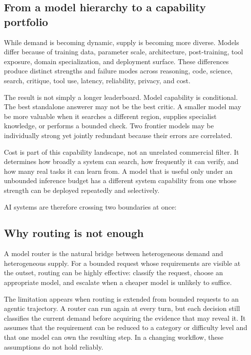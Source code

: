 \subsection{From a model hierarchy to a capability portfolio}

While demand is becoming dynamic, supply is becoming more diverse. Models
differ because of training data, parameter scale, architecture, post-training,
tool exposure, domain specialization, and deployment surface. These differences
produce distinct strengths and failure modes across reasoning, code, science,
search, critique, tool use, latency, reliability, privacy, and cost.

The result is not simply a longer leaderboard. Model capability is conditional.
The best standalone answerer may not be the best critic. A smaller model may be
more valuable when it searches a different region, supplies specialist
knowledge, or performs a bounded check. Two frontier models may be individually
strong yet jointly redundant because their errors are correlated.

Cost is part of this capability landscape, not an unrelated commercial filter.
It determines how broadly a system can search, how frequently it can verify,
and how many real tasks it can learn from. A model that is useful only under an
unbounded inference budget has a different system capability from one whose
strength can be deployed repeatedly and selectively.

AI systems are therefore crossing two boundaries at once:


\subsection{Why routing is not enough}

A model router is the natural bridge between heterogeneous demand and
heterogeneous supply. For a bounded request whose requirements are visible at
the outset, routing can be highly effective: classify the request, choose an
appropriate model, and escalate when a cheaper model is unlikely to suffice.

The limitation appears when routing is extended from bounded requests to an
agentic trajectory. A router can run again at every turn, but each decision
still classifies the current demand before acquiring the evidence that may
reveal it. It assumes that the requirement can be reduced to a category or
difficulty level and that one model can own the resulting step. In a changing
workflow, these assumptions do not hold reliably.

